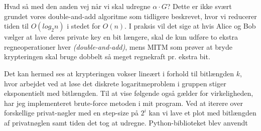 Hvad så med den anden vej når vi skal udregne $\alpha \cdot G$? Dette er ikke svært grundet vores double-and-add algoritme som tidligere beskrevet, hvor vi reducerer tiden til $O(log_{2}n)$ i stedet for $O(n)$. I praksis vil det sige at hvis Alice og Bob vælger at lave deres private key en bit længere, skal de kun udføre to ekstra regneoperationer hver \textit{(double-and-add)}, mens MITM som prøver at bryde krypteringen skal bruge dobbelt så meget regnekraft pr. ekstra bit.


Det kan hermed ses at krypteringen vokser lineært i forhold til bitlængden $k$, hvor arbejdet ved at løse det diskrete logaritmeproblem i gruppen stiger eksponentielt med bitlængden. Til at vise følgende også gælder for virkeligheden, har jeg implementeret brute-force metoden i mit program. Ved at iterere over forskellige privat-nøgler med en step-size på $2^i$ kan vi lave et plot med bitlængden af privatnøglen samt tiden det tog at udregne. Python-biblioteket  blev anvendt

